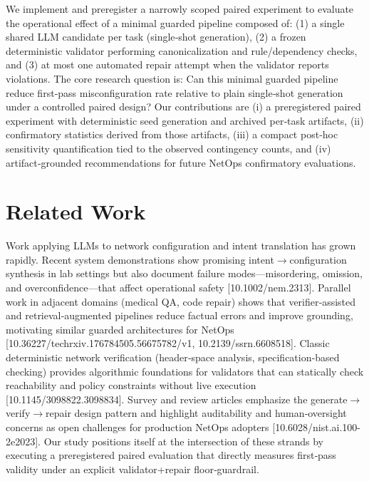 \documentclass[conference]{IEEEtran}
\begin{document}
We implement and preregister a narrowly scoped paired experiment to evaluate the operational effect of a minimal guarded pipeline composed of: (1) a single shared LLM candidate per task (single‑shot generation), (2) a frozen deterministic validator performing canonicalization and rule/dependency checks, and (3) at most one automated repair attempt when the validator reports violations. The core research question is: Can this minimal guarded pipeline reduce first‑pass misconfiguration rate relative to plain single‑shot generation under a controlled paired design? Our contributions are (i) a preregistered paired experiment with deterministic seed generation and archived per‑task artifacts, (ii) confirmatory statistics derived from those artifacts, (iii) a compact post‑hoc sensitivity quantification tied to the observed contingency counts, and (iv) artifact‑grounded recommendations for future NetOps confirmatory evaluations.

\section{Related Work}
Work applying LLMs to network configuration and intent translation has grown rapidly. Recent system demonstrations show promising intent\ensuremath{\rightarrow}configuration synthesis in lab settings but also document failure modes---misordering, omission, and overconfidence---that affect operational safety [10.1002/nem.2313]. Parallel work in adjacent domains (medical QA, code repair) shows that verifier‑assisted and retrieval‑augmented pipelines reduce factual errors and improve grounding, motivating similar guarded architectures for NetOps [10.36227/techrxiv.176784505.56675782/v1, 10.2139/ssrn.6608518]. Classic deterministic network verification (header‑space analysis, specification‑based checking) provides algorithmic foundations for validators that can statically check reachability and policy constraints without live execution [10.1145/3098822.3098834]. Survey and review articles emphasize the generate\ensuremath{\rightarrow}verify\ensuremath{\rightarrow}repair design pattern and highlight auditability and human‑oversight concerns as open challenges for production NetOps adopters [10.6028/nist.ai.100-2e2023]. Our study positions itself at the intersection of these strands by executing a preregistered paired evaluation that directly measures first‑pass validity under an explicit validator+repair floor‑guardrail.
\end{document}
